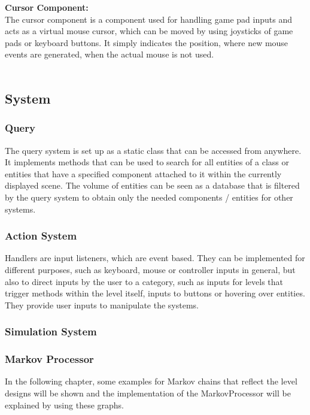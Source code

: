 \textbf{Cursor Component:} \\
The cursor component is a component used for handling game pad inputs and acts as a virtual mouse cursor, which can be moved by using
joysticks of game pads or keyboard buttons.
It simply indicates the position, where new mouse events are generated, when the actual mouse is not used. \\ \\

\subsection{System}\label{subsec:system}

\subsubsection{Query}\label{subsubsec:query2}
The query system is set up as a static class that can be accessed from anywhere.
It implements methods that can be used to search for all entities of a class or entities that have a specified component
attached to it within the currently displayed scene.
The volume of entities can be seen as a database that is filtered by the query system to obtain only the needed components / entities
for other systems. 

\subsubsection{Action System}\label{subsubsec:action-system}
Handlers are input listeners, which are event based.
They can be implemented for different purposes, such as keyboard, mouse or controller inputs in general, but also to direct inputs by the user
to a category, such as inputs for levels that trigger methods within the level itself, inputs to buttons or hovering over entities.
They provide user inputs to manipulate the systems. 


\subsubsection{Simulation System}\label{subsubsec:simulation-system}

\subsubsection{Markov Processor}\label{subsubsec:example-markov-chains}
In the following chapter, some examples for Markov chains that reflect the level designs will be shown and the implementation of the
MarkovProcessor will be explained by using these graphs.

